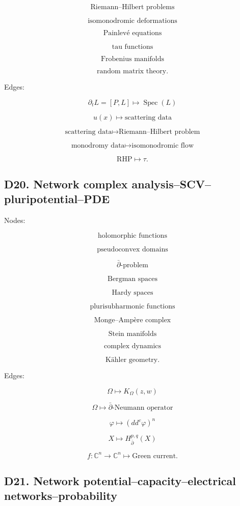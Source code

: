\documentclass[11pt]{article}
\begin{document}
\[
\text{Riemann--Hilbert problems}
\]

\[
\text{isomonodromic deformations}
\]

\[
\text{Painlevé equations}
\]

\[
\text{tau functions}
\]

\[
\text{Frobenius manifolds}
\]

\[
\text{random matrix theory}.
\]

Edges:

\[
\partial_t L=[P,L]\mapsto \operatorname{Spec}(L)
\]

\[
u(x)\mapsto \text{scattering data}
\]

\[
\text{scattering data}\mapsto \text{Riemann--Hilbert problem}
\]

\[
\text{monodromy data}\mapsto \text{isomonodromic flow}
\]

\[
\text{RHP}\mapsto \tau.
\]



\subsection{D20. Network complex analysis--SCV--pluripotential--PDE}

Nodes:

\[
\text{holomorphic functions}
\]

\[
\text{pseudoconvex domains}
\]

\[
\bar\partial\text{-problem}
\]

\[
\text{Bergman spaces}
\]

\[
\text{Hardy spaces}
\]

\[
\text{plurisubharmonic functions}
\]

\[
\text{Monge--Ampère complex}
\]

\[
\text{Stein manifolds}
\]

\[
\text{complex dynamics}
\]

\[
\text{Kähler geometry}.
\]

Edges:

\[
\Omega\mapsto K_\Omega(z,w)
\]

\[
\Omega\mapsto \bar\partial\text{-Neumann operator}
\]

\[
\varphi\mapsto (dd^c\varphi)^n
\]

\[
X\mapsto H^{p,q}_{\bar\partial}(X)
\]

\[
f:\mathbb C^n\to\mathbb C^n\mapsto \text{Green current}.
\]



\subsection{D21. Network potential--capacity--electrical networks--probability}
\end{document}
